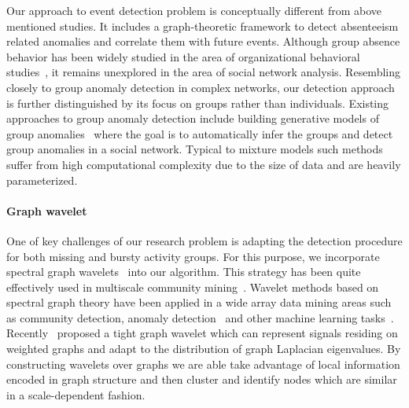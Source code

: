 Our approach to event detection problem is conceptually different from above mentioned studies. It includes a graph-theoretic framework to detect absenteeism related anomalies and correlate them with future events. Although group absence behavior has been widely studied in the area of organizational behavioral studies~\cite{gaudine2001effects,seamonds1982stress,chi2015ghost}, it remains unexplored in the area of social network analysis. Resembling closely to group anomaly detection in complex networks, our detection approach is further distinguished by its focus on groups rather than individuals. Existing approaches to group anomaly detection include building generative models of group anomalies~\cite{xiong2011hierarchical,yu2014glad} where the goal is to automatically infer the groups and detect group anomalies in a social network. Typical to mixture models such methods suffer from high computational complexity due to the size of data and are heavily parameterized.

\paragraph{Graph wavelet}
One of key challenges of our research problem is adapting the detection procedure for both missing and bursty activity groups. For this purpose, we incorporate spectral graph wavelets~\cite{hammond2011wavelets} into our algorithm. This strategy has been quite effectively used in multiscale community mining~\cite{tremblay2014graph}.
Wavelet methods based on spectral graph theory have been applied in a wide array data mining areas such as community detection, anomaly detection~\cite{calderara2011detecting} and other machine learning tasks~\cite{shuman_ACHA_2013,ghosh2003wavelet,rustamov2013wavelets,2000wavecluster}. Recently~\cite{shuman2015spectrum} proposed a tight graph wavelet which can represent signals residing on weighted graphs and adapt to the distribution of graph Laplacian eigenvalues.
By constructing wavelets over graphs we are able take advantage of local information encoded in graph structure and then cluster and identify nodes which are similar in a scale-dependent fashion.



